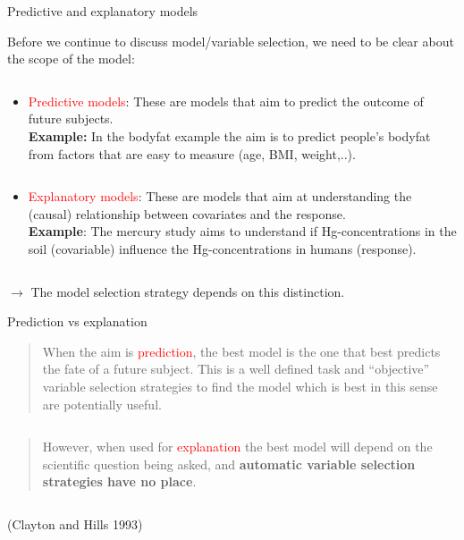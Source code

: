 \documentclass[
  10pt,
  ignorenonframetext,
]{beamer}
\providecommand{\tightlist}{%
  \setlength{\itemsep}{0pt}\setlength{\parskip}{0pt}}
\begin{document}
\begin{frame}
\begin{block}{Predictive and explanatory models}
\protect\hypertarget{predictive-and-explanatory-models}{}
\(~\)

Before we continue to discuss model/variable selection, we need to be
clear about the scope of the model:

\(~\)

\begin{itemize}
\tightlist
\item
  \textcolor{red}{Predictive models}: These are models that aim to
  predict the outcome of future subjects.\\
  \vspace{1mm} \textbf{Example:} In the bodyfat example the aim is to
  predict people's bodyfat from factors that are easy to measure (age,
  BMI, weight,..).
\end{itemize}

\(~\)

\begin{itemize}
\tightlist
\item
  \textcolor{red}{Explanatory models}: These are models that aim at
  understanding the (causal) relationship between covariates and the
  response.\\
  \vspace{1mm} \textbf{Example}: The mercury study aims to understand if
  Hg-concentrations in the soil (covariable) influence the
  Hg-concentrations in humans (response).
\end{itemize}

\(~\)

\(\rightarrow\) The model selection strategy depends on this
distinction.
\end{block}
\end{frame}

\begin{frame}
\begin{block}{Prediction vs explanation}
\protect\hypertarget{prediction-vs-explanation}{}
\(~\)

\begin{quote}
When the aim is \textcolor{red}{prediction}, the best model is the one
that best predicts the fate of a future subject. This is a well defined
task and ``objective'' variable selection strategies to find the model
which is best in this sense are potentially useful.
\end{quote}

\(~\)

\begin{quote}
However, when used for \textcolor{red}{explanation} the best model will
depend on the scientific question being asked, and \textbf{automatic
variable selection strategies have no place}.
\end{quote}

\(~\)

\scriptsize (Clayton and Hills 1993)
\end{block}
\end{frame}
\end{document}
